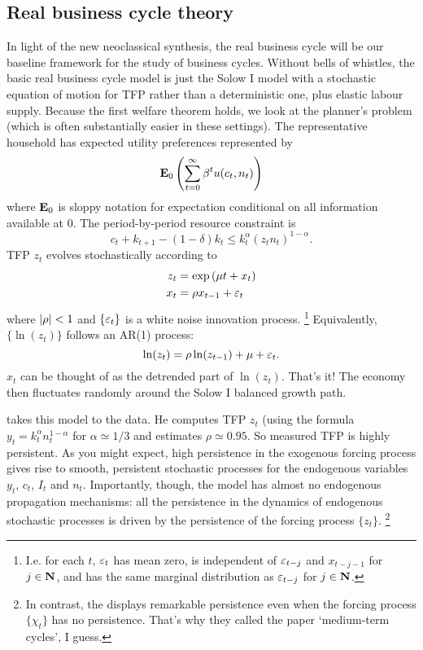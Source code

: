 \documentclass[11pt,letterpaper,reqno,oneside]{article}
\begin{document}
\subsection{Real business cycle theory}
\label{sec:18Nov2015:real_business_cycle_theory}

In light of the new neoclassical synthesis, the real business cycle will be our baseline framework for the study of business cycles. Without bells of whistles, the basic real business cycle model is just the Solow I model with a stochastic equation of motion for TFP rather than a deterministic one, plus elastic labour supply. Because the first welfare theorem holds, we look at the planner's problem (which is often substantially easier in these settings). The representative household has expected utility preferences represented by
%
\begin{equation*}
	\mathbf{E}_0\left( \sum_{t=0}^\infty \beta^t u(c_t,n_t) \right) 
\end{equation*}
%
where $\mathbf{E}_0$ is sloppy notation for expectation conditional on all information available at $0$. The period-by-period resource constraint is
%
\begin{equation*}
	c_t + k_{t+1} - (1-\delta) k_t \leq k_t^\alpha (z_t n_t)^{1-\alpha} .
\end{equation*}
%
TFP $z_t$ evolves stochastically according to
%
\begin{align*}
	z_t &= \exp \left( \mu t + x_t \right) 
	\\
	x_t &= \rho x_{t-1} + \varepsilon_t
\end{align*}
%
where $\lvert\rho\rvert<1$ and $\{ \varepsilon_t \}$ is a white noise innovation process.%
	\footnote{I.e. for each $t$, $\varepsilon_t$ has mean zero, is independent of $\varepsilon_{t-j}$ and $x_{t-j-1}$ for $j \in \mathbf{N}$, and has the same marginal distribution as $\varepsilon_{t-j}$ for $j \in \mathbf{N}$.}
Equivalently, $\{ \ln(z_t) \}$ follows an AR(1) process:
%
\begin{equation*}
	\ln(z_t) = \rho \ln(z_{t-1}) + \mu + \varepsilon_t .
\end{equation*}
%
$x_t$ can be thought of as the detrended part of $\ln(z_t)$. That's it! The economy then fluctuates randomly around the Solow I balanced growth path.


\textcite{Prescott1986} takes this model to the data. He computes TFP $z_t$ (using the formula $y_t = k_t^\alpha n_t^{1-\alpha}$ for $\alpha \simeq 1/3$ and estimates $\rho \simeq 0.95$. So measured TFP is highly persistent. As you might expect, high persistence in the exogenous forcing process gives rise to smooth, persistent stochastic processes for the endogenous variables $y_t$, $c_t$, $I_t$ and $n_t$. Importantly, though, the model has almost no endogenous propagation mechanisms: all the persistence in the dynamics of endogenous stochastic processes is driven by the persistence of the forcing process $\{ z_t \}$.%
	\footnote{In contrast, the \textcite{CominGertler2006} displays remarkable persistence even when the forcing process $\{ \chi_t \}$ has no persistence. That's why they called the paper `medium-term cycles', I guess.}
\end{document}
